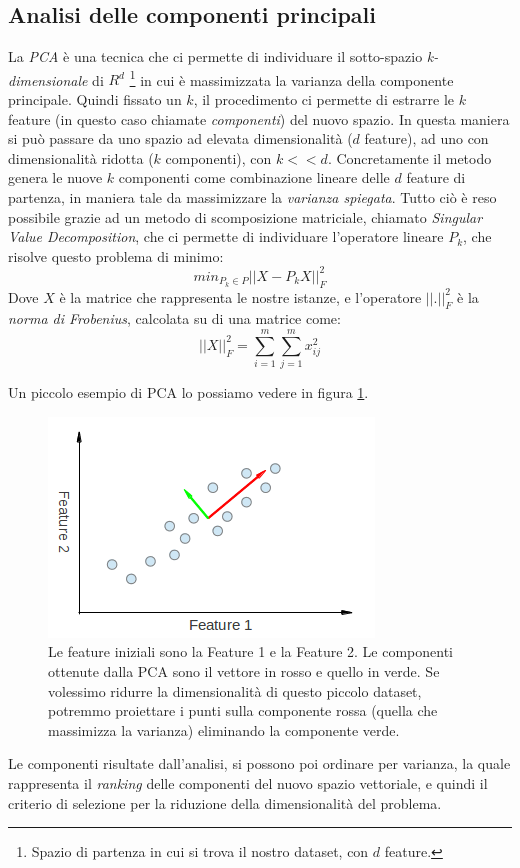 \documentclass[12pt]{report}
\begin{document}
\subsection{Analisi delle componenti principali}
La \emph{PCA} è una tecnica che ci permette di individuare il sotto-spazio \emph{k-dimensionale} di $R^{d}$ \footnote{\footnotesize{Spazio di partenza in cui si trova il nostro dataset, con $d$ feature.}} in cui è massimizzata la varianza della componente principale\cite{cesarid}. Quindi fissato un $k$, il procedimento ci permette di estrarre le $k$ feature (in questo caso chiamate \emph{componenti}) del nuovo spazio. In questa maniera si può passare da uno spazio ad elevata dimensionalità ($d$ feature), ad uno con dimensionalità ridotta ($k$ componenti), con $k<<d$.
\newline
\newline
Concretamente il metodo genera le nuove $k$ componenti come combinazione lineare delle $d$ feature di partenza, in maniera tale da massimizzare la \emph{varianza spiegata}. Tutto ciò è reso possibile grazie ad un metodo di scomposizione matriciale, chiamato \emph{Singular Value Decomposition\cite{cesarid}}, che ci permette di individuare l'operatore lineare $P_k$, che risolve questo problema di minimo:
\[
min_{P_k\in P} ||X - P_{k}X||^{2}_F
\]
Dove $X$ è la matrice che rappresenta le nostre istanze, e l'operatore $|| . ||^{2}_F$ è la \emph{norma di Frobenius}, calcolata su di una matrice come:
\[
||X||^{2}_F = \sum_{i=1}^{m}\sum_{j=1}^{m} x_{ij}^2
\]

Un piccolo esempio di PCA lo possiamo vedere in figura \ref{pca_ex}\cite{pca_ref}.
\begin{figure}[hp!]
\center
\includegraphics[scale=0.50]{./images/pca_eigen.png}
\caption{\footnotesize{Le feature iniziali sono la Feature 1 e la Feature 2. Le componenti ottenute dalla PCA sono il vettore in rosso e quello in verde. Se volessimo ridurre la dimensionalità di questo piccolo dataset, potremmo proiettare i punti sulla componente rossa (quella che massimizza la varianza) eliminando la componente verde.}}
\label{pca_ex}
\end{figure}
\newline
\newline
Le componenti risultate dall'analisi, si possono poi ordinare per varianza, la quale rappresenta il \emph{ranking} delle componenti del nuovo spazio vettoriale, e quindi il criterio di selezione per la riduzione della dimensionalità del problema.
\end{document}
